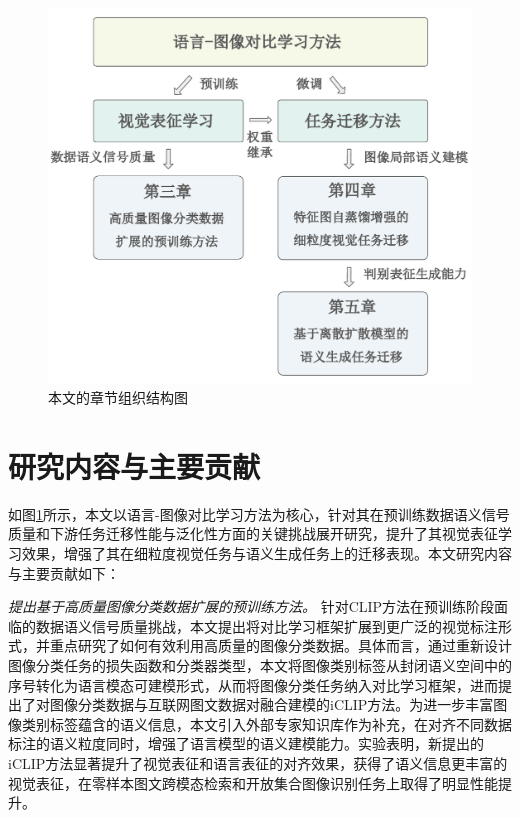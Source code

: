\begin{figure}
  \centering
  \includegraphics[width=0.8\linewidth]{figures/论文-结构安排-v3.pdf}
  \caption{本文的章节组织结构图}
  \label{fig:7-thesis-structure}
\end{figure}

\section{研究内容与主要贡献}

如图\ref{fig:7-thesis-structure}所示，本文以语言-图像对比学习方法为核心，针对其在预训练数据语义信号质量和下游任务迁移性能与泛化性方面的关键挑战展开研究，提升了其视觉表征学习效果，增强了其在细粒度视觉任务与语义生成任务上的迁移表现。本文研究内容与主要贡献如下：

\textit{提出基于高质量图像分类数据扩展的预训练方法。}
针对CLIP方法在预训练阶段面临的数据语义信号质量挑战，本文提出将对比学习框架扩展到更广泛的视觉标注形式，并重点研究了如何有效利用高质量的图像分类数据。具体而言，通过重新设计图像分类任务的损失函数和分类器类型，本文将图像类别标签从封闭语义空间中的序号转化为语言模态可建模形式，从而将图像分类任务纳入对比学习框架，进而提出了对图像分类数据与互联网图文数据对融合建模的iCLIP方法。为进一步丰富图像类别标签蕴含的语义信息，本文引入外部专家知识库作为补充，在对齐不同数据标注的语义粒度同时，增强了语言模型的语义建模能力。实验表明，新提出的iCLIP方法显著提升了视觉表征和语言表征的对齐效果，获得了语义信息更丰富的视觉表征，在零样本图文跨模态检索和开放集合图像识别任务上取得了明显性能提升。

